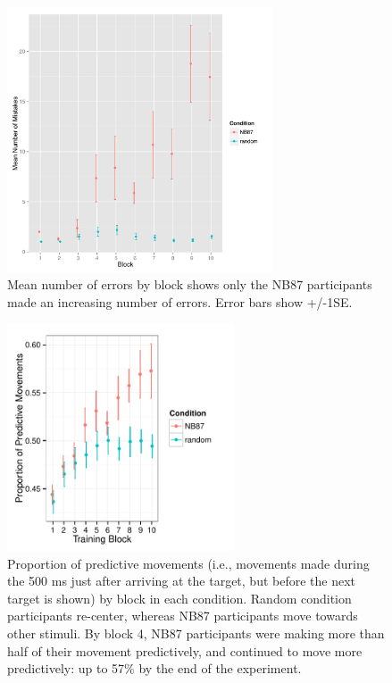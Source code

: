 \documentclass[man,floatsintext]{apa6}
\begin{document}
\begin{figure}[!h]
  \centering
  \includegraphics[width=0.7\textwidth]{figures/exp1_training_mistakes_per_block}
  \caption{Mean number of errors by block shows only the NB87 participants made an increasing number of errors. Error bars show +/-1SE.}
  \label{fig:fail-block}
\end{figure} 


\begin{figure}[!h]
  \centering
  \includegraphics[width=0.6\textwidth]{figures/exp1_predictive_moves_vs_block}
  \caption{\small{Proportion of predictive movements (i.e., movements made during the 500 ms just after arriving at the target, but before the next target is shown) by block in each condition. Random condition participants re-center, whereas NB87 participants move towards other stimuli. By block 4, NB87 participants were making more than half of their movement predictively, and continued to move more predictively: up to 57\% by the end of the experiment.}}
  \label{fig:predict}
\end{figure} 
\end{document}
